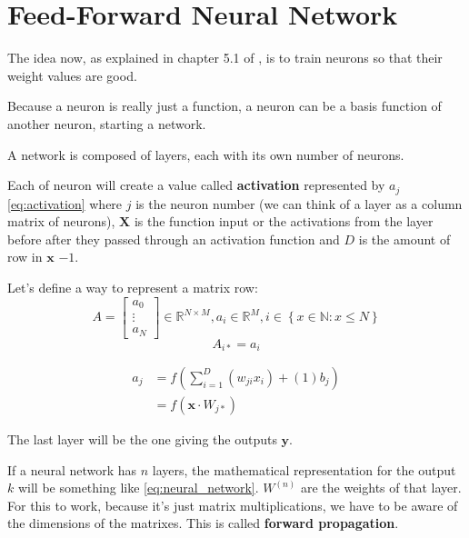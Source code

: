 \documentclass[a4paper,12pt]{article}
\theoremstyle{mytheoremstyle}
\theoremstyle{mytheoremstyle}
\theoremstyle{myproblemstyle}
\begin{document}
    \section{Feed-Forward Neural Network}

    The idea now, as explained in chapter 5.1 of \cite{bishop}, is to train
    neurons so that their weight values are good.

    Because a neuron is really just a function, a neuron can be a basis
    function of another neuron, starting a network.


    A network is composed of layers, each with its own number of neurons.


    Each of neuron will create a value called \textbf{activation} represented
    by $ a_{j} $ \eqref{eq:activation} where $ j $ is the neuron number (we can
    think of a layer as a column matrix of neurons), $ \mathbf{X} $ is the
    function input or the activations from the layer before after they passed
    through an activation function and $ D $ is the amount of row in $
    \mathbf{x} $ $ - 1 $.

    Let's define a way to represent a matrix row:
    $$
        A = \begin{bmatrix}a_{0}\\\vdots\\a_{N}\end{bmatrix} \in \mathbb{R}^{N
            \times M}, a_{i} \in \mathbb{R}^{M}, i \in \left\{ x \in
            \mathbb{N}: x \le N \right\}
    $$
    $$
        A_{i *} = a_{i}
    $$

    \begin{equation}
        \begin{split}
            a_{j} & = f \left( \displaystyle\sum_{i=1}^{D} \left( w_{ji}x_{i}
            \right) + (1)b_{j} \right) \\ & = f \left( \mathbf{x} \cdot W_{j *}
            \right)
        \end{split}
        \label{eq:activation}
    \end{equation}

    The last layer will be the one giving the outputs $ \mathbf{y} $.

    If a neural network has $ n $ layers, the mathematical representation for
    the output $ k $ will be something like \eqref{eq:neural_network}. $
    W^{(n)} $ are the weights of that layer. For this to work, because it's
    just matrix multiplications, we have to be aware of the dimensions of the
    matrixes. This is called \textbf{forward propagation}.
\end{document}
